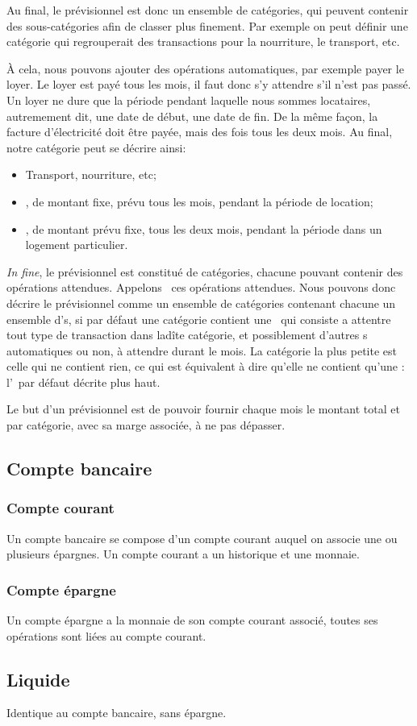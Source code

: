 Au final, le prévisionnel est donc un ensemble de catégories, qui
peuvent contenir des sous-catégories afin de classer plus finement. Par
exemple on peut définir une catégorie 
qui regrouperait des transactions pour la nourriture, le transport,
etc. 

\`A cela, nous pouvons ajouter des opérations automatiques, par
exemple payer le loyer. Le loyer est payé tous les mois, il faut
donc s'y attendre s'il n'est pas passé. Un loyer ne dure que la période
pendant laquelle nous sommes locataires, autremement dit, une date de
début, une date de fin. De la même façon, la facture d'électricité doit
être payée, mais des fois tous les deux mois. Au final, notre catégorie
 peut se décrire ainsi:
\begin{itemize}
\item Transport, nourriture, etc;
\item {}, de montant fixe, prévu tous les mois, pendant la période
                           de location;
\item {}, de montant prévu fixe, tous les deux mois,
                                    pendant la période dans un logement particulier.
\end{itemize}

\textit{In fine}, le prévisionnel est constitué de catégories, chacune pouvant
contenir des opérations attendues. Appelons \operation\ ces 
opérations attendues. Nous pouvons donc décrire le prévisionnel comme un 
ensemble de catégories contenant chacune un ensemble d'\operation s,
si par défaut une catégorie contient une \operation\ qui consiste
a attentre tout type de transaction dans ladîte catégorie, et possiblement
d'autres \operation s automatiques ou non, à attendre durant le mois.
La catégorie la plus petite est celle qui ne contient rien, ce qui
est équivalent à dire qu'elle ne contient qu'une \operation: l'\operation\
par défaut décrite plus haut.

Le but d'un prévisionnel est de pouvoir fournir chaque mois le montant total
et par catégorie, avec sa marge associée, à ne pas dépasser.

\subsection{Compte bancaire}
\subsubsection{Compte courant}
Un compte bancaire se compose d'un compte courant auquel
on associe une ou plusieurs épargnes. Un compte courant
a un historique et une monnaie.
\subsubsection{Compte épargne}
Un compte épargne a la monnaie de son compte courant associé, toutes
ses opérations sont liées au compte courant.
\subsection{Liquide}
Identique au compte bancaire, sans épargne.
